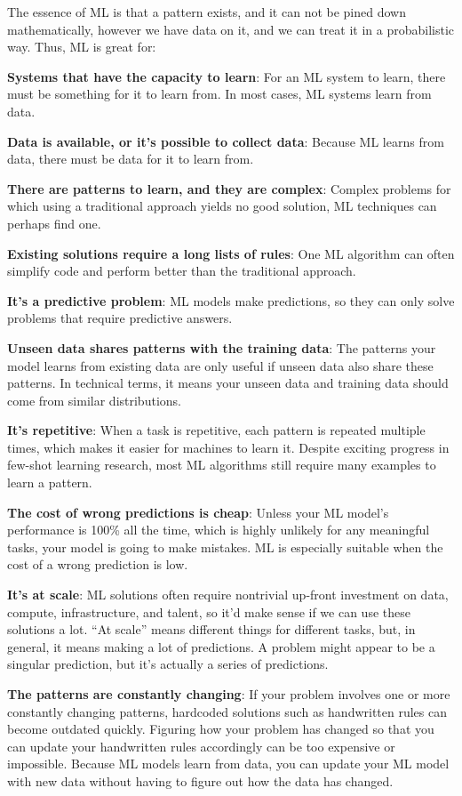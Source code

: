 The essence of ML is that a pattern exists, and it can not be pined down mathematically, however we have
data on it, and we can treat it in a probabilistic way. Thus, ML is great for:
\bit
\item \textbf{Systems that have the capacity to learn}: For an ML system to learn, there must be something for it to
learn from. In most cases, ML systems learn from data.
\item \textbf{Data is available, or it's possible to collect data}: Because ML learns from data, there must be data for
it to learn from.
\item \textbf{There are patterns to learn, and they are complex}: Complex problems for which using a traditional
approach yields no good solution, ML techniques can perhaps find one.
\item \textbf{Existing solutions require a long lists of rules}: One ML algorithm can often simplify code and perform
better than the traditional approach.
\item \textbf{It's a predictive problem}: ML models make predictions, so they can only solve problems that require
predictive answers.
\item \textbf{Unseen data shares patterns with the training data}: The patterns your model learns from existing data are
only useful if unseen data also share these patterns. In technical terms, it means your unseen data and training data
should come from similar distributions.
\item \textbf{It's repetitive}: When a task is repetitive, each pattern is repeated multiple times, which makes it
easier for machines to learn it. Despite exciting progress in few-shot learning research, most ML algorithms still
require many examples to learn a pattern.
\item \textbf{The cost of wrong predictions is cheap}: Unless your ML model's performance is 100\% all the time, which
is
highly unlikely for any meaningful tasks, your model is going to make mistakes. ML is especially suitable when the cost
of a wrong prediction is low.
\item \textbf{It's at scale}: ML solutions often require nontrivial up-front investment on data, compute,
infrastructure,
and talent, so it'd make sense if we can use these solutions a lot. ``At scale'' means different things for different
tasks, but, in general, it means making a lot of predictions. A problem might appear to be a singular prediction, but
it's actually a series of predictions.
\item \textbf{The patterns are constantly changing}: If your problem involves one or more constantly changing patterns,
hardcoded solutions such as handwritten rules can become outdated quickly. Figuring how your problem has changed so that
you can update your handwritten rules accordingly can be too expensive or impossible. Because ML models learn from data,
you can update your ML model with new data without having to figure out how the data has changed.
\eit

